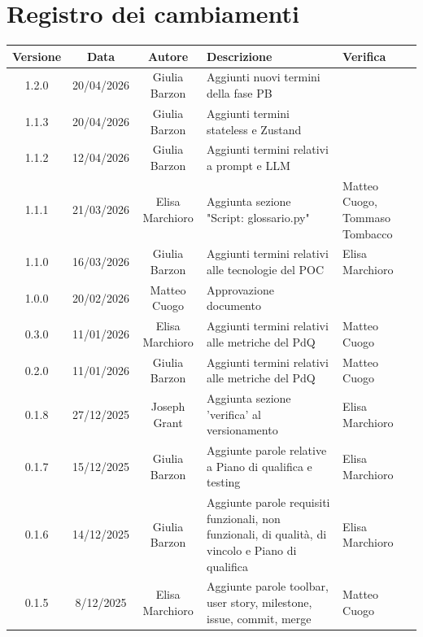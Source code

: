 \documentclass[11pt,a4paper]{article}
\begin{document}
\section*{Registro dei cambiamenti}

\begin{table}[H]
    \centering
    \begin{tabular}{|c|c|c|>{\raggedright\arraybackslash}p{}|p{}|}
        \hline
        \textbf{Versione} & \textbf{Data} & \textbf{Autore} & \textbf{Descrizione} & \textbf{Verifica} \\
        \hline
        1.2.0 & 20/04/2026 & Giulia Barzon & Aggiunti nuovi termini della fase PB & \\
        \hline
        1.1.3 & 20/04/2026 & Giulia Barzon & Aggiunti termini stateless e Zustand & \\
        \hline
        1.1.2 & 12/04/2026 & Giulia Barzon & Aggiunti termini relativi a prompt e LLM & \\
        \hline
        1.1.1 & 21/03/2026 & Elisa Marchioro & Aggiunta sezione "Script: glossario.py" & Matteo Cuogo, Tommaso Tombacco\\
        \hline
        1.1.0 & 16/03/2026 & Giulia Barzon & Aggiunti termini relativi alle tecnologie del POC & Elisa Marchioro\\
        \hline
        1.0.0 & 20/02/2026 & Matteo Cuogo & Approvazione documento & \\
        \hline
        0.3.0 & 11/01/2026 & Elisa Marchioro & Aggiunti termini relativi alle metriche del PdQ & Matteo Cuogo \\
        \hline
        0.2.0 & 11/01/2026 & Giulia Barzon & Aggiunti termini relativi alle metriche del PdQ &  Matteo Cuogo\\
        \hline
        0.1.8 & 27/12/2025 & Joseph Grant & Aggiunta sezione 'verifica' al versionamento & Elisa Marchioro\\
        \hline
        0.1.7 & 15/12/2025 & Giulia Barzon & Aggiunte parole relative a Piano di qualifica e testing & Elisa Marchioro\\
        \hline
        0.1.6 & 14/12/2025 & Giulia Barzon & Aggiunte parole requisiti funzionali, non funzionali, di qualità, di vincolo e Piano di qualifica & Elisa Marchioro\\
        \hline
        0.1.5 & 8/12/2025 & Elisa Marchioro & Aggiunte parole toolbar, user story, milestone, issue, commit, merge & Matteo Cuogo\\
        \hline

\end{tabular}
\end{table}
\end{document}
